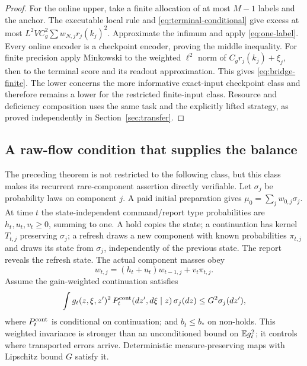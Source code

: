 \begin{proof}
For the online upper, take a finite allocation of at most $M-1$ labels and the anchor. The executable local rule and \eqref{eq:terminal-conditional} give excess at most $L^2VC_g^2\sum w_{N,j}r_j(k_j)^2$. Approximate the infimum and apply \eqref{eq:one-label}. Every online encoder is a checkpoint encoder, proving the middle inequality. For finite precision apply Minkowski to the weighted $\ell^2$ norm of $C_g r_j(k_j)+\xi_j$, then to the terminal score and its readout approximation. This gives \eqref{eq:bridge-finite}. The lower concerns the more informative exact-input checkpoint class and therefore remains a lower for the restricted finite-input class. Resource and deficiency composition uses the same task and the explicitly lifted strategy, as proved independently in Section~\ref{sec:transfer}.
\end{proof}

\subsection{A raw-flow condition that supplies the balance}
The preceding theorem is not restricted to the following class, but this class makes its recurrent rare-component assertion directly verifiable. Let $\sigma_j$ be probability laws on component $j$. A paid initial preparation gives $\mu_0=\sum_jw_{0,j}\sigma_j$. At time $t$ the state-independent command/report type probabilities are $h_t,u_t,v_t\ge0$, summing to one. A hold copies the state; a continuation has kernel $T_{t,j}$ preserving $\sigma_j$; a refresh draws a new component with known probabilities $\pi_{t,j}$ and draws its state from $\sigma_j$, independently of the previous state. The report reveals the refresh state. The actual component masses obey
\begin{equation}\label{eq:raw-flow}
 w_{t,j}=(h_t+u_t)w_{t-1,j}+v_t\pi_{t,j}.
\end{equation}
Assume the gain-weighted continuation satisfies
\[
 \int g_t(z,\xi,z')^2\,P_t^{\rm cont}(dz',d\xi\mid z)\,\sigma_j(dz)
       \le G^2\sigma_j(dz'),
\]
where $P_t^{\rm cont}$ is conditional on continuation; and $b_t\le b_*$ on non-holds. This weighted invariance is stronger than an unconditioned bound on $\mathbb E g_t^2$; it controls where transported errors arrive. Deterministic measure-preserving maps with Lipschitz bound $G$ satisfy it.

